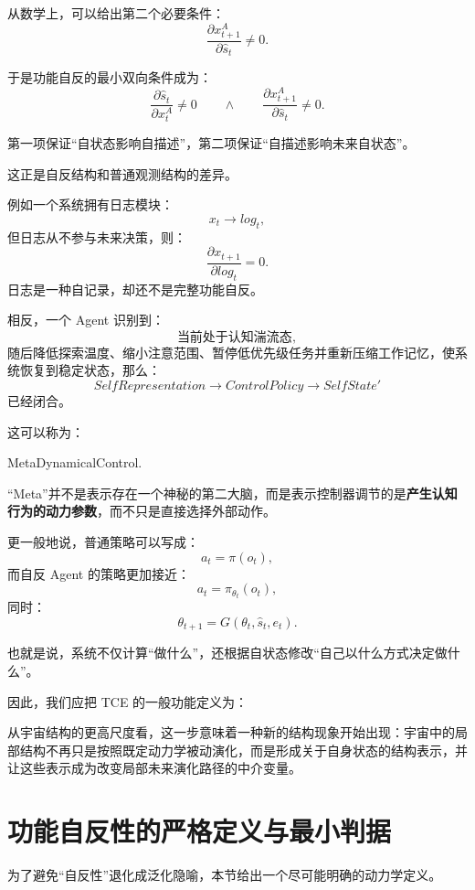 从数学上，可以给出第二个必要条件：
\[
\boxed{
\frac{\partial x_{t+1}^A}
{\partial \hat s_t}
\neq 0.
}
\]

于是功能自反的最小双向条件成为：
\[
\boxed{
\frac{\partial \hat s_t}
{\partial x_t^A}
\neq 0
\qquad\land\qquad
\frac{\partial x_{t+1}^A}
{\partial \hat s_t}
\neq 0.
}
\]

第一项保证“自状态影响自描述”，第二项保证“自描述影响未来自状态”。

这正是自反结构和普通观测结构的差异。

例如一个系统拥有日志模块：
\[
x_t\rightarrow log_t,
\]
但日志从不参与未来决策，则：
\[
\frac{\partial x_{t+1}}{\partial log_t}=0.
\]
日志是一种自记录，却还不是完整功能自反。

相反，一个 Agent 识别到：
\[
\text{当前处于认知湍流态},
\]
随后降低探索温度、缩小注意范围、暂停低优先级任务并重新压缩工作记忆，使系统恢复到稳定状态，那么：
\[
SelfRepresentation
\rightarrow
ControlPolicy
\rightarrow
SelfState'
\]
已经闭合。

这可以称为：
\begin{statementbox}
MetaDynamicalControl.
\end{statementbox}

“Meta”并不是表示存在一个神秘的第二大脑，而是表示控制器调节的是\textbf{产生认知行为的动力参数}，而不只是直接选择外部动作。

更一般地说，普通策略可以写成：
\[
a_t=\pi(o_t),
\]
而自反 Agent 的策略更加接近：
\[
a_t
=
\pi_{\theta_t}(o_t),
\]
同时：
\[
\theta_{t+1}
=
G(
\theta_t,
\hat s_t,
e_t
).
\]

也就是说，系统不仅计算“做什么”，还根据自状态修改“自己以什么方式决定做什么”。

因此，我们应把 TCE 的一般功能定义为：
\begin{statementbox}
\centering
{}
\end{statementbox}

从宇宙结构的更高尺度看，这一步意味着一种新的结构现象开始出现：宇宙中的局部结构不再只是按照既定动力学被动演化，而是形成关于自身状态的结构表示，并让这些表示成为改变局部未来演化路径的中介变量。

\section{功能自反性的严格定义与最小判据}

为了避免“自反性”退化成泛化隐喻，本节给出一个尽可能明确的动力学定义。

